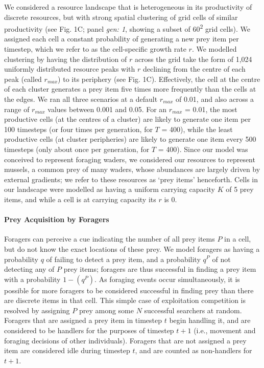 \documentclass[11pt]{article}
\begin{document}
We considered a resource landscape that is heterogeneous in its productivity of discrete resources, but with strong spatial clustering of grid cells of similar productivity (see Fig. 1C; panel \textit{gen: 1}, showing a subset of 60\textsuperscript{2} grid cells).
We assigned each cell a constant probability of generating a new prey item per timestep, which we refer to as the cell-specific growth rate $r$.
We modelled clustering by having the distribution of $r$ across the grid take the form of 1,024 uniformly distributed resource peaks with $r$ declining from the centre of each peak (called $r_{max}$) to its periphery (see Fig. 1C).
Effectively, the cell at the centre of each cluster generates a prey item five times more frequently than the cells at the edges.
We ran all three scenarios at a default $r_{max}$ of 0.01, and also across a range of $r_{max}$ values between 0.001 and 0.05.
For an $r_{max}$ = 0.01, the most productive cells (at the centres of a cluster) are likely to generate one item per 100 timesteps (or four times per generation, for $T$ = 400), while the least productive cells (at cluster peripheries) are likely to generate one item every 500 timesteps (only about once per generation, for $T$ = 400).
Since our model was conceived to represent foraging waders, we considered our resources to represent mussels, a common prey of many waders, whose abundances are largely driven by external gradients; we refer to these resources as `prey items' henceforth.
Cells in our landscape were modelled as having a uniform carrying capacity $K$ of 5 prey items, and while a cell is at carrying capacity its $r$ is 0.

\paragraph{Prey Acquisition by Foragers}

Foragers can perceive a cue indicating the number of all prey items $P$ in a cell, but do not know the exact locations of these prey.
We model foragers as having a probability $q$ of failing to detect a prey item, and a probability $q^P$ of not detecting any of $P$ prey items; foragers are thus successful in finding a prey item with a probability $1 - (q^P)$.
As foraging events occur simultaneously, it is possible for more foragers to be considered successful in finding prey than there are discrete items in that cell.
This simple case of exploitation competition is resolved by assigning $P$ prey among some $N$ successful searchers at random.
Foragers that are assigned a prey item in timestep $t$ begin handling it, and are considered to be handlers for the purposes of timestep $t+1$ (i.e., movement and foraging decisions of other individuals).
Foragers that are not assigned a prey item are considered idle during timestep $t$, and are counted as non-handlers for $t+1$.
\end{document}
